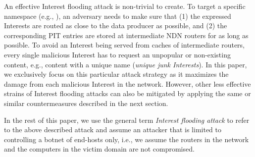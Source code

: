 
An effective Interest flooding attack is non-trivial to create.
To target a specific namespace (e.g., ), an adversary needs to make sure that (1) the expressed Interests are routed as close to the data producer as possible, and (2) the corresponding PIT entries are stored at intermediate NDN routers for as long as possible.
To avoid an Interest being served from caches of intermediate routers, every single malicious Interest has to request an unpopular or non-existing content, e.g., content with a unique name (\emph{unique junk Interests}). In this paper, we exclusively focus on this particular attack strategy as it maximizes the damage from each malicious Interest in the network. However, other less effective strains of Interest flooding attacks can also be mitigated by applying the same or similar countermeasures described in the next section.  

In the rest of this paper, we use the general term \emph{Interest flooding attack} to refer to the above described attack and assume an attacker that is limited to controlling a botnet of end-hosts only, i.e., we assume the routers in the network and the computers in the victim domain are not compromised.




